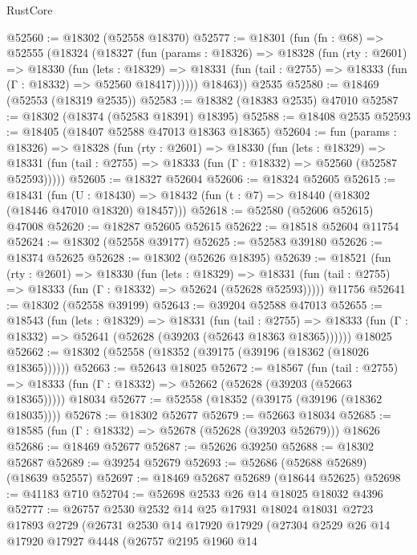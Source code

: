 \begin{lexlean}{RustCore}
\begin{coremodule}
@52560 := @18302 (@52558 @18370)
@52577 := @18301
    (fun (fn : @68) =>
    @52555
      (@18324
        (@18327
          (fun (params : @18326) =>
          @18328
            (fun (rty : @2601) =>
            @18330
              (fun (lets : @18329) =>
              @18331 (fun (tail : @2755) => @18333 (fun (Γ : @18332) => @52560 @18417))))))
        @18463))
    @2535
@52580 := @18469 (@52553 (@18319 @2535))
@52583 := @18382 (@18383 @2535) @47010
@52587 := @18302 (@18374 (@52583 @18391) @18395)
@52588 := @18408 @2535
@52593 := @18405 (@18407 @52588 @47013 @18363 @18365)
@52604 := fun (params : @18326) =>
  @18328
    (fun (rty : @2601) =>
    @18330
      (fun (lets : @18329) =>
      @18331 (fun (tail : @2755) => @18333 (fun (Γ : @18332) => @52560 (@52587 @52593)))))
@52605 := @18327 @52604
@52606 := @18324 @52605
@52615 := @18431
    (fun (U : @18430) => @18432 (fun (t : @7) => @18440 (@18302 (@18446 @47010 @18320) @18457)))
@52618 := @52580 (@52606 @52615) @47008
@52620 := @18287 @52605 @52615
@52622 := @18518 @52604 @11754
@52624 := @18302 (@52558 @39177)
@52625 := @52583 @39180
@52626 := @18374 @52625
@52628 := @18302 (@52626 @18395)
@52639 := @18521
    (fun (rty : @2601) =>
    @18330
      (fun (lets : @18329) =>
      @18331 (fun (tail : @2755) => @18333 (fun (Γ : @18332) => @52624 (@52628 @52593)))))
    @11756
@52641 := @18302 (@52558 @39199)
@52643 := @39204 @52588 @47013
@52655 := @18543
    (fun (lets : @18329) =>
    @18331
      (fun (tail : @2755) =>
      @18333 (fun (Γ : @18332) => @52641 (@52628 (@39203 (@52643 @18363 @18365))))))
    @18025
@52662 := @18302 (@52558 (@18352 (@39175 (@39196 (@18362 (@18026 @18365))))))
@52663 := @52643 @18025
@52672 := @18567
    (fun (tail : @2755) => @18333 (fun (Γ : @18332) => @52662 (@52628 (@39203 (@52663 @18365)))))
    @18034
@52677 := @52558 (@18352 (@39175 (@39196 (@18362 @18035))))
@52678 := @18302 @52677
@52679 := @52663 @18034
@52685 := @18585 (fun (Γ : @18332) => @52678 (@52628 (@39203 @52679))) @18626
@52686 := @18469 @52677
@52687 := @52626 @39250
@52688 := @18302 @52687
@52689 := @39254 @52679
@52693 := @52686 (@52688 @52689) (@18639 @52557)
@52697 := @18469 @52687 @52689 (@18644 @52625)
@52698 := @41183 @710
@52704 := @52698 @2533 @26 @14 @18025 @18032 @4396
@52777 := @26757
    @2530
    @2532
    @14
    @25
    @17931
    @18024
    @18031
    @2723
    @17893
    @2729
    (@26731
      @2530
      @14
      @17920
      @17929
      (@27304
        @2529
        @26
        @14
        @17920
        @17927
        @4448
        (@26757
          @2195
          @1960
          @14

\end{coremodule}
\end{lexlean}
